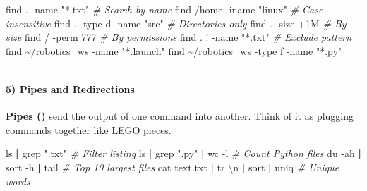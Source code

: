\documentclass[
  english,
  paper=a4,
  oneside  ,captions=tableheading
]{scrartcl}
\newenvironment{Shaded}{}{}
\newcommand{\AttributeTok}[1]{\textcolor[rgb]{0.49,0.56,0.16}{#1}}
\newcommand{\CommentTok}[1]{\textcolor[rgb]{0.38,0.63,0.69}{\textit{#1}}}
\newcommand{\FunctionTok}[1]{\textcolor[rgb]{0.02,0.16,0.49}{#1}}
\newcommand{\KeywordTok}[1]{\textcolor[rgb]{0.00,0.44,0.13}{\textbf{#1}}}
\newcommand{\NormalTok}[1]{#1}
\newcommand{\StringTok}[1]{\textcolor[rgb]{0.25,0.44,0.63}{#1}}
\begin{document}
\begin{Shaded}
\begin{Highlighting}[]
\FunctionTok{find}\NormalTok{ . }\AttributeTok{{-}name} \StringTok{"*.txt"}                        \CommentTok{\# Search by name}
\FunctionTok{find}\NormalTok{ /home }\AttributeTok{{-}iname} \StringTok{"linux"}                   \CommentTok{\# Case{-}insensitive}
\FunctionTok{find}\NormalTok{ . }\AttributeTok{{-}type}\NormalTok{ d }\AttributeTok{{-}name} \StringTok{"src"}                  \CommentTok{\# Directories only}
\FunctionTok{find}\NormalTok{ . }\AttributeTok{{-}size}\NormalTok{ +1M                            }\CommentTok{\# By size}
\FunctionTok{find}\NormalTok{ / }\AttributeTok{{-}perm}\NormalTok{ 777                            }\CommentTok{\# By permissions}
\FunctionTok{find}\NormalTok{ . ! }\AttributeTok{{-}name} \StringTok{"*.txt"}                      \CommentTok{\# Exclude pattern}
\FunctionTok{find}\NormalTok{ \textasciitilde{}/robotics\_ws }\AttributeTok{{-}name} \StringTok{"*.launch"}
\FunctionTok{find}\NormalTok{ \textasciitilde{}/robotics\_ws }\AttributeTok{{-}type}\NormalTok{ f }\AttributeTok{{-}name} \StringTok{"*.py"}
\end{Highlighting}
\end{Shaded}

\begin{center}\rule{0.5\linewidth}{0.5pt}\end{center}

\paragraph{5) Pipes and Redirections}\label{pipes-and-redirections}

\textbf{Pipes (\texttt{\textbar{}})} send the output of one command into
another. Think of it as plugging commands together like LEGO pieces.

\begin{Shaded}
\begin{Highlighting}[]
\FunctionTok{ls} \KeywordTok{|} \FunctionTok{grep} \StringTok{".txt"}                            \CommentTok{\# Filter listing}
\FunctionTok{ls} \KeywordTok{|} \FunctionTok{grep} \StringTok{".py"} \KeywordTok{|} \FunctionTok{wc} \AttributeTok{{-}l}                     \CommentTok{\# Count Python files}
\FunctionTok{du} \AttributeTok{{-}ah} \KeywordTok{|} \FunctionTok{sort} \AttributeTok{{-}h} \KeywordTok{|} \FunctionTok{tail}                     \CommentTok{\# Top 10 largest files}
\FunctionTok{cat}\NormalTok{ text.txt }\KeywordTok{|} \FunctionTok{tr} \StringTok{\textquotesingle{} \textquotesingle{}} \StringTok{\textquotesingle{}\textbackslash{}n\textquotesingle{}} \KeywordTok{|} \FunctionTok{sort} \KeywordTok{|} \FunctionTok{uniq}   \CommentTok{\# Unique words}
\end{Highlighting}
\end{Shaded}
\end{document}
